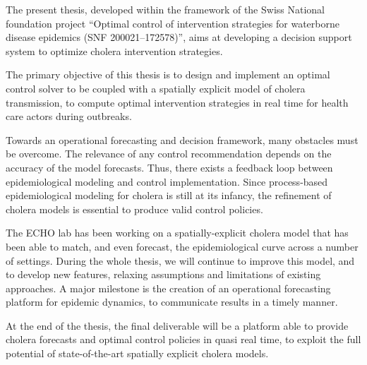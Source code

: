 The present thesis, developed within the framework of the Swiss National foundation project ``Optimal
control of intervention strategies for waterborne disease epidemics (SNF 200021--172578)'', aims at developing a decision support system to optimize cholera intervention strategies.

The  primary objective of this thesis is to design and implement an optimal control solver to be coupled with a spatially explicit model of cholera transmission, to compute optimal intervention strategies in real time for health care actors during outbreaks.

Towards an operational forecasting and decision framework, many obstacles must be overcome. The relevance of any control recommendation depends on the accuracy of the model forecasts. Thus, there exists a feedback loop between epidemiological modeling and control implementation. Since process-based epidemiological modeling for cholera is still at its infancy, the refinement of cholera models is essential to produce valid control policies.

The ECHO lab has been working on a spatially-explicit cholera model that has been able to match, and even forecast, the epidemiological curve across a number of settings. During the whole thesis, we will continue to improve this model, and to develop new features, relaxing assumptions and limitations of existing approaches. A major milestone is the creation of an operational forecasting platform for epidemic dynamics, to communicate results in a timely manner.

At the end of the thesis, the final deliverable will be a platform able to provide cholera forecasts and optimal control policies in quasi real time, to exploit the full potential of state-of-the-art spatially explicit cholera models.






